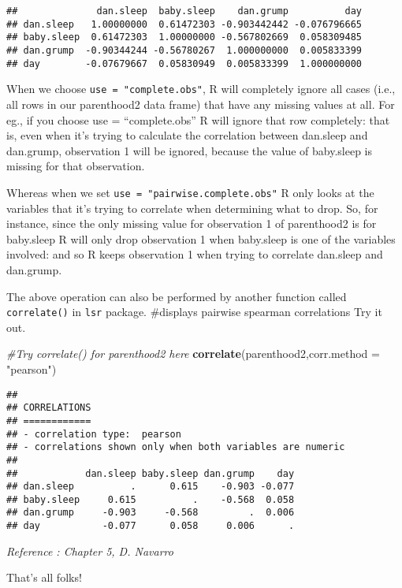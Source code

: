 \documentclass[
]{article}
\newenvironment{Shaded}{\begin{snugshade}}{\end{snugshade}}
\newcommand{\AttributeTok}[1]{\textcolor[rgb]{0.13,0.29,0.53}{#1}}
\newcommand{\CommentTok}[1]{\textcolor[rgb]{0.56,0.35,0.01}{\textit{#1}}}
\newcommand{\FunctionTok}[1]{\textcolor[rgb]{0.13,0.29,0.53}{\textbf{#1}}}
\newcommand{\NormalTok}[1]{#1}
\newcommand{\StringTok}[1]{\textcolor[rgb]{0.31,0.60,0.02}{#1}}
\begin{document}
\begin{verbatim}
##              dan.sleep  baby.sleep    dan.grump          day
## dan.sleep   1.00000000  0.61472303 -0.903442442 -0.076796665
## baby.sleep  0.61472303  1.00000000 -0.567802669  0.058309485
## dan.grump  -0.90344244 -0.56780267  1.000000000  0.005833399
## day        -0.07679667  0.05830949  0.005833399  1.000000000
\end{verbatim}

When we choose \texttt{use\ =\ "complete.obs"}, R will completely ignore
all cases (i.e., all rows in our parenthood2 data frame) that have any
missing values at all. For eg., if you choose use = ``complete.obs'' R
will ignore that row completely: that is, even when it's trying to
calculate the correlation between dan.sleep and dan.grump, observation 1
will be ignored, because the value of baby.sleep is missing for that
observation.

Whereas when we set \texttt{use\ =\ "pairwise.complete.obs"} R only
looks at the variables that it's trying to correlate when determining
what to drop. So, for instance, since the only missing value for
observation 1 of parenthood2 is for baby.sleep R will only drop
observation 1 when baby.sleep is one of the variables involved: and so R
keeps observation 1 when trying to correlate dan.sleep and dan.grump.

The above operation can also be performed by another function called
\texttt{correlate()} in \texttt{lsr} package. \#displays pairwise
spearman correlations Try it out.

\begin{Shaded}
\begin{Highlighting}[]
\CommentTok{\#Try correlate() for parenthood2 here}
\FunctionTok{correlate}\NormalTok{(parenthood2,}\AttributeTok{corr.method =} \StringTok{"pearson"}\NormalTok{)}
\end{Highlighting}
\end{Shaded}

\begin{verbatim}
## 
## CORRELATIONS
## ============
## - correlation type:  pearson 
## - correlations shown only when both variables are numeric
## 
##            dan.sleep baby.sleep dan.grump    day
## dan.sleep          .      0.615    -0.903 -0.077
## baby.sleep     0.615          .    -0.568  0.058
## dan.grump     -0.903     -0.568         .  0.006
## day           -0.077      0.058     0.006      .
\end{verbatim}

\emph{Reference : Chapter 5, D. Navarro}

That's all folks!
\end{document}
